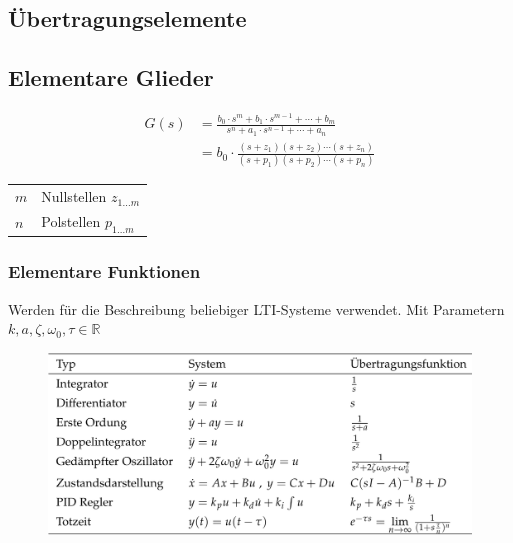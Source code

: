 \documentclass[
  10pt,
  a4paper,
]{article}
\makeatletter
\numberwithin{equation}{section}
\newenvironment{conditions}
  {\par\vspace{\abovedisplayskip}\noindent\begin{tabular}{>{$}l<{$} @{${}:{}$} l}}
  {\end{tabular}\par\vspace{\belowdisplayskip}}
\makeatother
\begin{document}
\begin{multicols}{2}
\hypertarget{uxfcbertragungselemente}{%
\section{Übertragungselemente}\label{uxfcbertragungselemente}}

\hypertarget{elementare-glieder}{%
\subsection{Elementare Glieder}\label{elementare-glieder}}

\[
\begin{split}
G(s) &= \frac{b_0\cdot s^m+b_1\cdot s^{m-1}+\cdots+b_m}{s^n+a_1\cdot s^{n-1}+\cdots+a_n} \\
 &= b_0\cdot\frac{(s+z_1)(s+z_2)\cdots(s+z_n)}{(s+p_1)(s+p_2)\cdots(s+p_n)}
\end{split}
\]

\begin{conditions}
  m & Nullstellen $z_{1\dots m}$ \\
  n & Polstellen $p_{1\dots m}$ \\
\end{conditions}

\hypertarget{elementare-funktionen}{%
\subsubsection{Elementare Funktionen}\label{elementare-funktionen}}

Werden für die Beschreibung beliebiger LTI-Systeme verwendet. Mit
Parametern \(k,a,\zeta,\omega_0,\tau \in \mathbb{R}\)

\begin{figure}[H]

{\centering \includegraphics{images/paste-16.png}

}

\end{figure}


\end{multicols}
\end{document}
